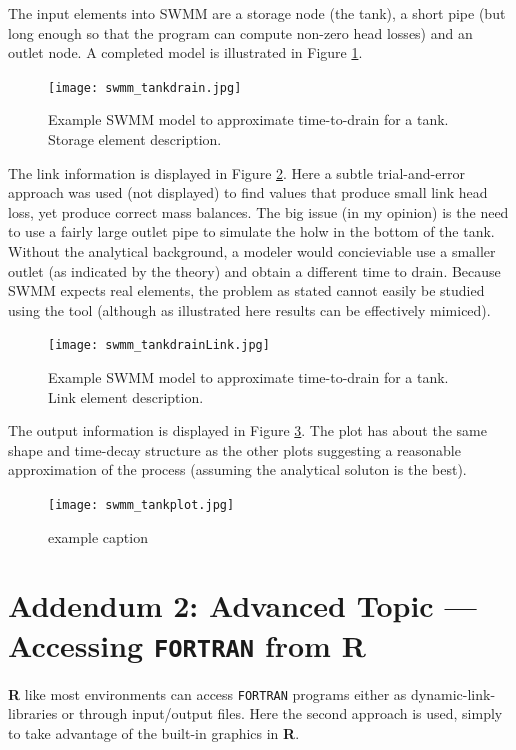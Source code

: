 \documentclass[12pt]{article}
\begin{document}
The input elements into SWMM are a storage node (the tank), a short pipe (but long enough so that the program can compute non-zero head losses) and an outlet node.  A completed model is illustrated in Figure \ref{fig:swmm_tankdrain}.

\begin{figure}[htbp] %
   \centering
   \texttt{[image: swmm\_tankdrain.jpg]} 
   \caption{Example SWMM model to approximate time-to-drain for a tank.  Storage element description.}
   \label{fig:swmm_tankdrain}
\end{figure}

The link information is displayed in Figure \ref{fig:swmm_tankdrainLink}.  Here a subtle trial-and-error approach was used (not displayed) to find values that produce small link head loss, yet produce correct mass balances.  The big issue (in my opinion) is the need to use a fairly large outlet pipe to simulate the holw in the bottom of the tank.  Without the analytical background, a modeler would concieviable use a smaller outlet (as indicated by the theory) and obtain a different time to drain.   Because SWMM expects real elements, the problem as stated cannot easily be studied using the tool (although as illustrated here results can be effectively mimiced).

\begin{figure}[htbp] %
   \centering
   \texttt{[image: swmm\_tankdrainLink.jpg]} 
   \caption{Example SWMM model to approximate time-to-drain for a tank.  Link element description.}
   \label{fig:swmm_tankdrainLink}
\end{figure}


The output  information is displayed in Figure \ref{fig:swmm_tankplot}.  The plot has about the same shape and time-decay structure as the other plots suggesting a reasonable approximation of the process (assuming the analytical soluton is the best).

\begin{figure}[htbp] %
   \centering
   \texttt{[image: swmm\_tankplot.jpg]} 
   \caption{example caption}
   \label{fig:swmm_tankplot}
\end{figure}


\newpage
\section{Addendum 2: Advanced Topic --- Accessing \texttt{FORTRAN} from \textbf{R}}
\textbf{R} like most environments can access \texttt{FORTRAN} programs either as dynamic-link-libraries or through input/output files.  Here the second approach is used, simply to take advantage of the built-in graphics in \textbf{R}. 
\end{document}

